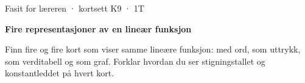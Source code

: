 \documentclass[11pt,a4paper]{article}
\begin{document}
\begin{minipage}[t]{0.8\linewidth}\vspace{0pt}
{\sffamily\small\color{dempet}Fasit for læreren · kortsett K9 · 1T}\par\vspace{0.25em}
{\fontsize{20}{24}\selectfont\bfseries Fire representasjoner av en lineær funksjon}\par\vspace{0.5em}
Finn fire og fire kort som viser samme lineære funksjon: med ord, som uttrykk, som verditabell og som graf. Forklar hvordan du ser stigningstallet og konstantleddet på hvert kort.\par{}
\end{minipage}\hfill
\begin{minipage}[t]{0.15\linewidth}\vspace{0pt}\raggedleft
{}
\end{minipage}\par\vspace{0.8em}
\end{document}
